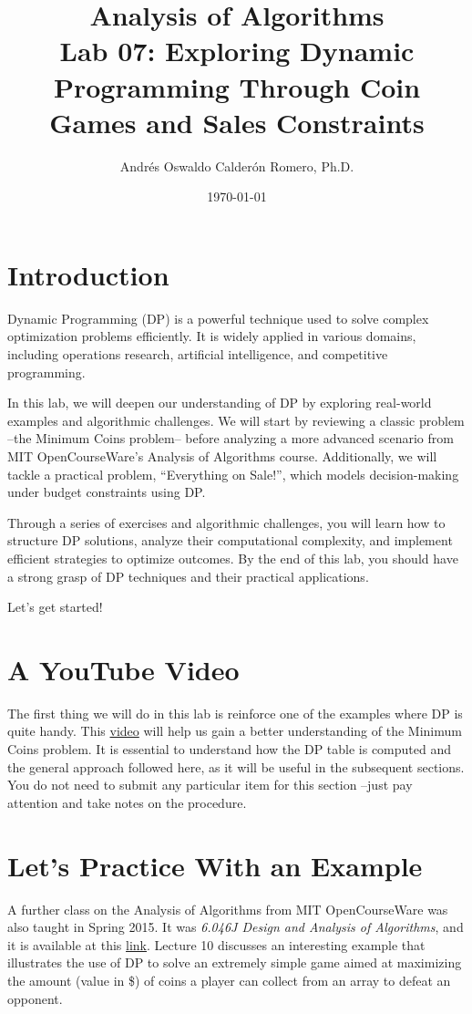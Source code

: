 \documentclass[12pt]{article}
\title{Analysis of Algorithms \\ Lab 07: Exploring Dynamic Programming Through Coin Games and Sales Constraints}
\author{Andrés Oswaldo Calderón Romero, Ph.D.}
\date{\today}
\begin{document}
\maketitle

\section{Introduction}
Dynamic Programming (DP) is a powerful technique used to solve complex optimization problems efficiently. It is widely applied in various domains, including operations research, artificial intelligence, and competitive programming.

In this lab, we will deepen our understanding of DP by exploring real-world examples and algorithmic challenges. We will start by reviewing a classic problem --the Minimum Coins problem-- before analyzing a more advanced scenario from MIT OpenCourseWare’s Analysis of Algorithms course. Additionally, we will tackle a practical problem, ``Everything on Sale!'', which models decision-making under budget constraints using DP.

Through a series of exercises and algorithmic challenges, you will learn how to structure DP solutions, analyze their computational complexity, and implement efficient strategies to optimize outcomes. By the end of this lab, you should have a strong grasp of DP techniques and their practical applications.

Let's get started!

\section{A YouTube Video}
The first thing we will do in this lab is reinforce one of the examples where DP is quite handy. This \href{https://youtu.be/Sf4OKx1Wz9w?si=sq4UsK_EzD2tZGkx}{video} will help us gain a better understanding of the Minimum Coins problem. It is essential to understand how the DP table is computed and the general approach followed here, as it will be useful in the subsequent sections. You do not need to submit any particular item for this section --just pay attention and take notes on the procedure.

\section{Let's Practice With an Example}
A further class on the Analysis of Algorithms from MIT OpenCourseWare was also taught in Spring 2015. It was \textit{6.046J Design and Analysis of Algorithms}, and it is available at this \href{https://ocw.mit.edu/courses/6-046j-design-and-analysis-of-algorithms-spring-2015/}{link}. Lecture 10 discusses an interesting example that illustrates the use of DP to solve an extremely simple game aimed at maximizing the amount (value in \$) of coins a player can collect from an array to defeat an opponent.
\end{document}
